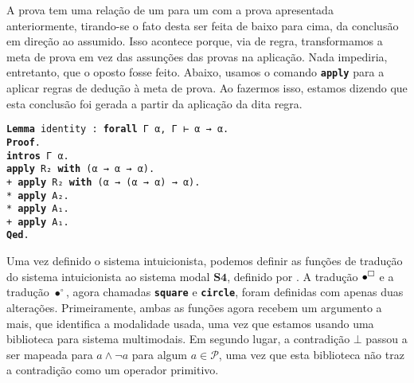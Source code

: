 A prova tem uma relação de um para um com a prova apresentada anteriormente, tirando-se o fato desta ser feita de baixo para cima, da conclusão em direção ao assumido.
Isso acontece porque, via de regra, transformamos a meta de prova em vez das assunções das provas na aplicação.
Nada impediria, entretanto, que o oposto fosse feito.
Abaixo, usamos o comando \texttt{\footnotesize\textbf{apply}} para a aplicar regras de dedução à meta de prova.
Ao fazermos isso, estamos dizendo que esta conclusão foi gerada a partir da aplicação da dita regra.
\hfill\break
\begin{mdframed}
\noindent
\texttt
{\noindent\footnotesize\textbf{Lemma} identity : \textbf{forall} Γ α, Γ ⊢ α → α.\\
\textbf{Proof}.\\
\phantom{\ \ \ \ }\textbf{intros} Γ α.\\
\phantom{\ \ \ \ }\textbf{apply} R₂ \textbf{with} (α → α → α).\\
\phantom{\ \ \ \ }+ \textbf{apply} R₂ \textbf{with} (α → (α → α) → α).\\
\phantom{\ \ \ \ }\phantom{\ \ \ \ }* \textbf{apply} A₂.\\
\phantom{\ \ \ \ }\phantom{\ \ \ \ }* \textbf{apply} A₁.\\
\phantom{\ \ \ \ }+ \textbf{apply} A₁.\\
\textbf{Qed}.
}
\end{mdframed}
\hfill\break
Uma vez definido o sistema intuicionista, podemos definir as funções de tradução do sistema intuicionista ao sistema modal $\mathbf{S4}$, definido por \cite{Silveira}.
A tradução $\bullet^\Box$ e a tradução $\bullet^\circ$, agora chamadas \texttt{\footnotesize\textbf{square}} e \texttt{\footnotesize\textbf{circle}}, foram definidas com apenas duas alterações.
Primeiramente, ambas as funções agora recebem um argumento a mais, que identifica a modalidade usada, uma vez que estamos usando uma biblioteca para sistema multimodais.
Em segundo lugar, a contradição $\bot$ passou a ser mapeada para $a\wedge\neg a$ para algum $a\in\mathcal{P}$, uma vez que esta biblioteca não traz a contradição como um operador primitivo.
\hfill\break
